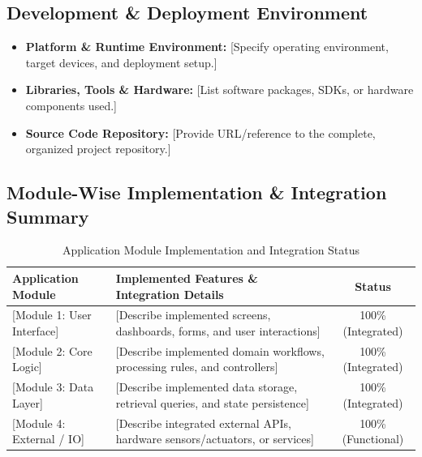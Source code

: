 \documentclass[11pt, a4paper]{article}
\begin{document}
\subsection{Development \& Deployment Environment}
\begin{itemize}[noitemsep, topsep=2pt]
    \item \textbf{Platform \& Runtime Environment:} {[Specify operating environment, target devices, and deployment setup.]}
    \item \textbf{Libraries, Tools \& Hardware:} {[List software packages, SDKs, or hardware components used.]}
    \item \textbf{Source Code Repository:} {[Provide URL/reference to the complete, organized project repository.]}
\end{itemize}

\subsection{Module-Wise Implementation \& Integration Summary}
\begin{table}[H]
    \centering
    \footnotesize
    \renewcommand{\arraystretch}{1.25}
    \begin{tabular}{|p{3.5cm}|p{7.8cm}|c|}
        \hline
        \textbf{Application Module} & \textbf{Implemented Features \& Integration Details} & \textbf{Status} \\
        \hline
        {[Module 1: User Interface]} & {[Describe implemented screens, dashboards, forms, and user interactions]} & 100\% (Integrated) \\
        \hline
        {[Module 2: Core Logic]} & {[Describe implemented domain workflows, processing rules, and controllers]} & 100\% (Integrated) \\
        \hline
        {[Module 3: Data Layer]} & {[Describe implemented data storage, retrieval queries, and state persistence]} & 100\% (Integrated) \\
        \hline
        {[Module 4: External / IO]} & {[Describe integrated external APIs, hardware sensors/actuators, or services]} & 100\% (Functional) \\
        \hline
    \end{tabular}
    \caption{Application Module Implementation and Integration Status}
\end{table}
\end{document}
